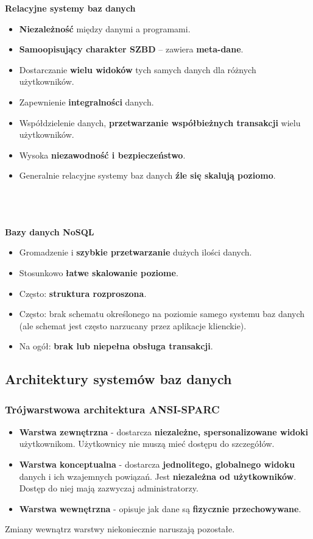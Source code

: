 \documentclass[a4paper]{article}
\begin{document}
\textbf{Relacyjne systemy baz danych}
\begin{itemize}
    \item \textbf{Niezależność} między danymi a programami.
    \item \textbf{Samoopisujący charakter SZBD} – zawiera \textbf{meta-dane}.
    \item Dostarczanie \textbf{wielu widoków}  tych samych danych dla różnych użytkowników.
    \item Zapewnienie \textbf{integralności} danych.
    \item Współdzielenie danych, \textbf{przetwarzanie współbieżnych transakcji} wielu użytkowników.
    \item Wysoka \textbf{niezawodność i bezpieczeństwo}.
    \item Generalnie relacyjne systemy baz danych \textbf{źle się skalują poziomo}.
\end{itemize}
\hfill \\\\\\
\textbf{Bazy danych NoSQL}
\begin{itemize}
    \item Gromadzenie i \textbf{szybkie przetwarzanie} dużych ilości danych.
    \item Stosunkowo \textbf{łatwe skalowanie poziome}.
    \item Często: \textbf{struktura rozproszona}.
    \item Często: brak schematu określonego na poziomie samego systemu baz danych (ale schemat jest często narzucany przez aplikacje klienckie).
    \item Na ogół: \textbf{brak lub niepełna obsługa transakcji}.
\end{itemize}

\subsection{Architektury systemów baz danych}

\subsubsection{Trójwarstwowa architektura ANSI-SPARC}
\begin{itemize}
    \item \textbf{Warstwa zewnętrzna} - dostarcza \textbf{niezależne, spersonalizowane widoki} użytkownikom. Użytkownicy nie muszą mieć dostępu do szczegółów.
    \item \textbf{Warstwa konceptualna} - dostarcza \textbf{jednolitego, globalnego widoku} danych i ich wzajemnych powiązań. Jest \textbf{niezależna od użytkowników}. Dostęp do niej mają zazwyczaj administratorzy.
    \item \textbf{Warstwa wewnętrzna} -  opisuje jak dane są \textbf{fizycznie przechowywane}.
\end{itemize}
Zmiany wewnątrz warstwy niekoniecznie naruszają pozostałe.
\end{document}
